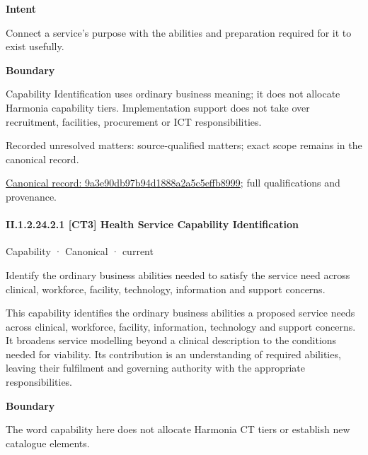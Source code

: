 \textbf{Intent}



Connect a service's purpose with the abilities and preparation required for it to exist usefully.



\textbf{Boundary}



Capability Identification uses ordinary business meaning; it does not allocate Harmonia capability tiers. Implementation support does not take over recruitment, facilities, procurement or ICT responsibilities.


{\small Recorded unresolved matters: source-qualified matters; exact scope remains in the canonical record.}\par
{\footnotesize \href{../../../../continuum/strategy/capability/9a3e90db97b94d1888a2a5c5effb8999.md}{Canonical record: 9a3e90db97b94d1888a2a5c5effb8999}; full qualifications and provenance.}\par
\paragraph*{II.1.2.24.2.1 [CT3] Health Service Capability Identification}
\label{navigation:II.1.2.24.2.1}

\label{element:53f64a402905438aa87f9d16eff876da}
{\small Capability · Canonical · current}\par

Identify the ordinary business abilities needed to satisfy the service need across clinical, workforce, facility, technology, information and support concerns.



This capability identifies the ordinary business abilities a proposed service needs across clinical, workforce, facility, information, technology and support concerns. It broadens service modelling beyond a clinical description to the conditions needed for viability. Its contribution is an understanding of required abilities, leaving their fulfilment and governing authority with the appropriate responsibilities.



\textbf{Boundary}



The word capability here does not allocate Harmonia CT tiers or establish new catalogue elements.


